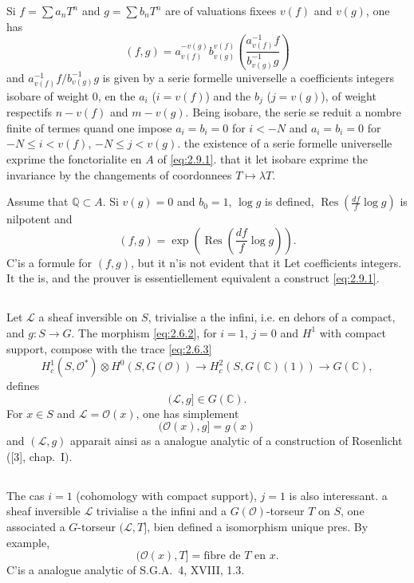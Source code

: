 \documentclass[12pt,a4paper]{article}
\theoremstyle{plain}
\theoremstyle{definition}
\theoremstyle{remark}
\DeclareMathOperator{\Res}{Res}
\newcommand{\cO}{\mathcal{O}}
\newcommand{\Q}{\mathbb{Q}}
\newcommand{\C}{\mathbb{C}}
\newcommand{\cL}{\mathcal{L}}
\providecommand{\cL}{\mathcal{L}}
\providecommand{\cO}{\mathcal{O}}
\begin{document}
Si $f = \sum a_n T^n$ and $g = \sum b_n T^n$ are of valuations fixees $v(f)$ and $v(g)$, one has
\[
(f,g) = a_{v(f)}^{-v(g)} b_{v(g)}^{v(f)} \left(\frac{a_{v(f)}^{-1} f}{b_{v(g)}^{-1} g}\right)
\]
and $a_{v(f)}^{-1} f / b_{v(g)}^{-1} g$ is given by a serie formelle universelle a coefficients integers isobare
of weight $0$, en the $a_i$ ($i = v(f)$) and the $b_j$ ($j = v(g)$), of weight respectifs $n - v(f)$
and $m - v(g)$. Being isobare, the serie se reduit a nombre finite of termes quand one impose
$a_i = b_i = 0$ for $i < -N$ and $a_i = b_i = 0$ for $-N \leq i < v(f)$, $-N \leq j < v(g)$.
the existence of a serie formelle universelle exprime the fonctorialite en $A$ of \eqref{eq:2.9.1}.
that it let isobare exprime the invariance by the changements of coordonnees $T \mapsto \lambda T$.

Assume that $\Q \subset A$. Si $v(g) = 0$ and $b_0 = 1$, $\log g$ is defined, $\Res(\frac{df}{f}\log g)$ is nilpotent
and
\[
(f,g) = \exp\left(\Res\left(\frac{df}{f}\log g\right)\right).
\]
C'is a formule for $(f,g)$, but it n'is not evident that it Let coefficients integers.
It the is, and the prouver is essentiellement equivalent a construct \eqref{eq:2.9.1}.

\subsection{}

Let $\cL$ a sheaf inversible on $S$, trivialise a the infini, i.e. en dehors
of a compact, and $g : S \to G$. The morphism \eqref{eq:2.6.2}, for $i = 1$, $j = 0$ and $H^1$ with compact support, compose with the trace \eqref{eq:2.6.3}
\[
H^1_c(S, \cO^*) \otimes H^0(S, G(\cO)) \to H^2_c(S, G(\C)(1)) \to G(\C),
\]
defines
\[
(\cL, g] \in G(\C).
\]
For $x \in S$ and $\cL = \cO(x)$, one has simplement
\[
(\cO(x), g] = g(x)
\]
and $(\cL, g)$ apparait ainsi as a analogue analytic of a construction of Rosenlicht ([3], chap.~I).

\subsection{}

The cas $i = 1$ (cohomology with compact support), $j = 1$ is also interessant.
a sheaf inversible $\cL$ trivialise a the infini and a $G(\cO)$-torseur $T$ on $S$, one associated
a $G$-torseur $(\cL, T]$, bien defined a isomorphism unique pres. By example,
\[
(\cO(x), T] = \text{fibre de } T \text{ en } x.
\]
C'is a analogue analytic of S.G.A.~4, XVIII, 1.3.
\end{document}
